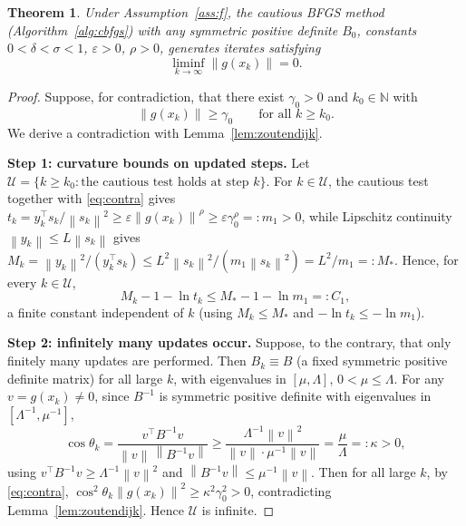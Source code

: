 \documentclass{amsart}
\newtheorem{theorem}{Theorem}
\theoremstyle{definition}
\newcommand{\N}{\mathbb{N}}
\newcommand{\norm}[1]{\left\lVert #1\right\rVert}
\begin{document}
\begin{theorem}\label{thm:main}
Under Assumption~\ref{ass:f}, the cautious BFGS method
(Algorithm~\ref{alg:cbfgs}) with any symmetric positive definite $B_0$,
constants $0<\delta<\sigma<1$, $\varepsilon>0$, $\rho>0$, generates iterates
satisfying
\[
   \liminf_{k\to\infty}\norm{g(x_k)}=0 .
\]
\end{theorem}

\begin{proof}
Suppose, for contradiction, that there exist $\gamma_0>0$ and $k_0\in\N$ with
\begin{equation}\label{eq:contra}
   \norm{g(x_k)}\ge\gamma_0\qquad\text{for all }k\ge k_0 .
\end{equation}
We derive a contradiction with Lemma~\ref{lem:zoutendijk}.

\medskip\noindent\textbf{Step 1: curvature bounds on updated steps.}
Let $\mathcal{U}=\{k\ge k_0:\text{the cautious test holds at step }k\}$. For
$k\in\mathcal{U}$, the cautious test together with \eqref{eq:contra} gives
$t_k=y_k^\top s_k/\norm{s_k}^2\ge\varepsilon\norm{g(x_k)}^\rho
\ge\varepsilon\gamma_0^\rho=:m_1>0$, while Lipschitz continuity
$\norm{y_k}\le L\norm{s_k}$ gives
$M_k=\norm{y_k}^2/(y_k^\top s_k)\le L^2\norm{s_k}^2/(m_1\norm{s_k}^2)
=L^2/m_1=:M_*$. Hence, for every $k\in\mathcal{U}$,
\begin{equation}\label{eq:term-bound}
   M_k-1-\ln t_k\le M_*-1-\ln m_1=:C_1 ,
\end{equation}
a finite constant independent of $k$ (using $M_k\le M_*$ and $-\ln t_k\le-\ln m_1$).

\medskip\noindent\textbf{Step 2: infinitely many updates occur.}
Suppose, to the contrary, that only finitely many updates are performed. Then
$B_k\equiv B$ (a fixed symmetric positive definite matrix) for all large $k$,
with eigenvalues in $[\mu,\Lambda]$, $0<\mu\le\Lambda$. For any
$v=g(x_k)\neq0$, since $B^{-1}$ is symmetric positive definite with eigenvalues
in $[\Lambda^{-1},\mu^{-1}]$,
\[
   \cos\theta_k=\frac{v^\top B^{-1}v}{\norm{v}\,\norm{B^{-1}v}}
   \ge\frac{\Lambda^{-1}\norm{v}^2}{\norm{v}\cdot\mu^{-1}\norm{v}}
   =\frac{\mu}{\Lambda}=:\kappa>0 ,
\]
using $v^\top B^{-1}v\ge\Lambda^{-1}\norm{v}^2$ and
$\norm{B^{-1}v}\le\mu^{-1}\norm{v}$. Then for all large $k$, by
\eqref{eq:contra}, $\cos^2\theta_k\norm{g(x_k)}^2\ge\kappa^2\gamma_0^2>0$,
contradicting Lemma~\ref{lem:zoutendijk}. Hence $\mathcal{U}$ is infinite.


\end{proof}
\end{document}
